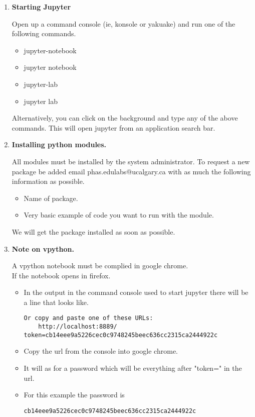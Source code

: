 \documentclass{../../../assets/LabArx-Dev} 	%
\begin{document}
\begin{enumerate}

\item {\bf Starting Jupyter}
	
	Open up a command console (ie, konsole or yakuake) and run one 		of the following commands.
	\begin {itemize}
		\item jupyter-notebook
		\item jupyter notebook
		\item jupyter-lab
		\item jupyter lab
	\end{itemize}
	Alternatively, you can click on the background and type any of the above commands. This will open jupyter from an application search bar.  

\item{\bf Installing python modules.}
	
	All modules must be installed by the system administrator. To 		request a new package be added email phas.edulabs@ucalgary.ca 		with as much the following information as possible.

	\begin{itemize}
		\item{Name of package.}
		\item{Very basic example of code you want to run with the 			module.}
	\end{itemize}
	
	We will get the package installed as soon as possible.
	
\item {\bf Note on vpython.}

	A vpython notebook must be complied in google chrome.\\If the 		notebook opens in firefox.
	
	\begin{itemize}
		\item In the output in the command console used to start 			jupyter there will be a line that looks like.\\

\begin{lstlisting}[backgroundcolor = \color{light-gray}]
Or copy and paste one of these URLs:
    http://localhost:8889/ token=cb14eee9a5226cec0c9748245beec636cc2315ca2444922c
	\end{lstlisting}

		\item Copy the url from the console into google chrome.
		\item It will as for a password which will be everything 			after "token=" in the url.
		\item For this example the password is

\begin{lstlisting}[backgroundcolor = \color{light-gray}]
 cb14eee9a5226cec0c9748245beec636cc2315ca2444922c
\end{lstlisting}
	\end{itemize}

\end{enumerate}
\end{document}
